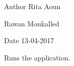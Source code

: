 \begin{DoxyAuthor}{\-Author}
\-Rita \-Aoun 

\-Rawan \-Moukalled 
\end{DoxyAuthor}
\begin{DoxyDate}{\-Date}
13-\/04-\/2017
\end{DoxyDate}
\-Runs the application. 